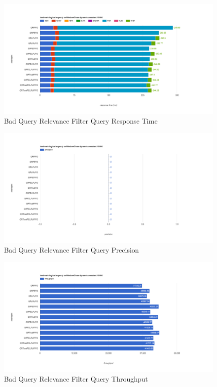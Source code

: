 \begin{figure}[!htbp]
	\centering
    \includegraphics[width=6.5in]{img/app3-bqr-r.png}
    \caption{Bad Query Relevance Filter Query Response Time}
\end{figure}
\begin{figure}[!htbp]
	\centering
    \includegraphics[width=6.5in]{img/app3-bqr-p.png}
    \caption{Bad Query Relevance Filter Query Precision}
\end{figure}
\begin{figure}[!htbp]
	\centering
    \includegraphics[width=6.5in]{img/app3-bqr-t.png}
    \caption{Bad Query Relevance Filter Query Throughput}
\end{figure}
